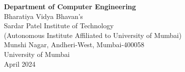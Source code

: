 \begin{titlepage}
{\begin{figure}[h]
\end{figure}
\hspace{.05cm}
\hspace{.05cm}
\textbf {Department of Computer Engineering}\\
Bharatiya  Vidya Bhavan's\\
Sardar Patel Institute of Technology\\
(Autonomous Institute Affiliated to University of Mumbai)\\
Munshi Nagar, Andheri-West, Mumbai-400058\\
University of Mumbai\\
\hspace{6.25cm}April 2024}\\
\end{titlepage}
\newpage


